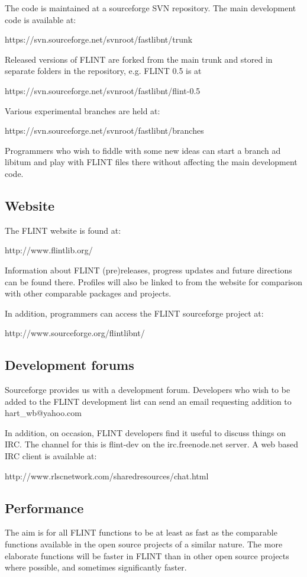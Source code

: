 \documentclass[a4paper,10pt]{article}
\begin{document}
The code is maintained at a sourceforge SVN repository. The main development code is available at:

https://svn.sourceforge.net/svnroot/fastlibnt/trunk

Released versions of FLINT are forked from the main trunk and stored in separate folders in the repository, e.g. FLINT 0.5 is at

https://svn.sourceforge.net/svnroot/fastlibnt/flint-0.5

Various experimental branches are held at:

https://svn.sourceforge.net/svnroot/fastlibnt/branches

Programmers who wish to fiddle with some new ideas can start a branch ad libitum and play with FLINT files there without affecting the main development code.

\subsection{Website}
The FLINT website is found at:

http://www.flintlib.org/

Information about FLINT (pre)releases, progress updates and future directions can be found there. Profiles will also be linked to from the website for comparison with other comparable packages and projects.

In addition, programmers can access the FLINT sourceforge project at:

http://www.sourceforge.org/flintlibnt/

\subsection{Development forums}
Sourceforge provides us with a development forum. Developers who wish to be added to the FLINT development list can send an email requesting addition to hart\_wb@yahoo.com

In addition, on occasion, FLINT developers find it useful to discuss things on IRC. The channel for this is flint-dev on the irc.freenode.net server. A web based IRC client is available at:

http://www.rlscnetwork.com/sharedresources/chat.html
 
\subsection{Performance}
The aim is for all FLINT functions to be at least as fast as the comparable functions available in the open source projects of a similar nature. The more elaborate functions will be faster in FLINT than in other open source projects where possible, and sometimes significantly faster.
\end{document}
